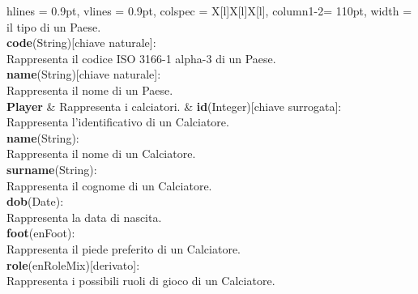 \begin{tblr}{
    hlines = {0.9pt}, vlines = {0.9pt}, colspec = {X[l]X[l]X[l]}, column{1-2}= {110pt},
    width = \textwidth
}
{			il tipo di un Paese.\\
		\medskip\textbf{code}(String)[chiave naturale]:
			\\Rappresenta il codice ISO 3166-1 alpha-3
			di un Paese.\\
		\medskip\textbf{name}(String)[chiave naturale]:
			\\Rappresenta il nome di un Paese.
	}
	\\
	{
		\textbf{Player}
	}
	&
	{
		Rappresenta i calciatori.
	}
	&
	{
		\textbf{id}(Integer)[chiave surrogata]:\\Rappresenta
			l'identificativo di un Calciatore.\\
		\medskip\textbf{name}(String):\\Rappresenta
			il nome di un Calciatore.\\
		\medskip\textbf{surname}(String):\\Rappresenta
			il cognome di un Calciatore.\\
		\medskip\textbf{dob}(Date):\\Rappresenta
			la data di nascita.\\
		\medskip\textbf{foot}(enFoot):\\Rappresenta
			il piede preferito di un Calciatore.\\
		\medskip\textbf{role}(enRoleMix)[derivato]:
			\\Rappresenta i possibili ruoli di gioco
			di un Calciatore.
	}
	\\
\end{tblr}


\newpage



